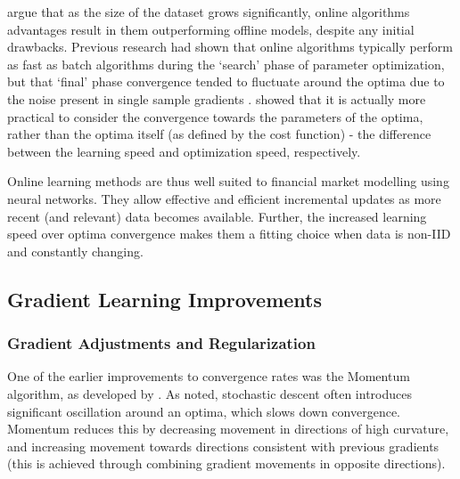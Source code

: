 \documentclass[a4paper,11pt,oneside]{article}
\theoremstyle{plain}
\theoremstyle{definition}
\begin{document}
	\citet{Bottou} argue that as the size of the dataset grows significantly, online algorithms advantages result in 
	them outperforming offline models, despite any initial drawbacks. Previous research had shown that online 
	algorithms typically perform as fast as batch algorithms during the ‘search’ phase of parameter optimization, but 
	that ‘final’ phase convergence tended to fluctuate around the optima due to the noise present in single sample 
	gradients \citep{LeCun, Bottou2}. \citet{Bottou} showed that it is actually more practical to consider the convergence towards
	the parameters of the optima, rather than the optima itself (as defined by the cost function) - the difference 
	between the learning speed and optimization speed, respectively. 
	\hfill\break
	
	Online learning methods are thus well suited to financial market modelling using neural networks. They allow effective and efficient incremental updates as more recent (and relevant) data 
	becomes available. Further, the increased learning speed over optima convergence makes them a fitting choice when data is non-IID and 
	constantly changing.
	
	\subsection{Gradient Learning Improvements}\label{lr_grad_improv}
	
	\subsubsection{Gradient Adjustments and Regularization}
	
	One of the earlier improvements to convergence rates was the Momentum algorithm, as developed by \citet{Tseng}. 
	As noted, stochastic descent often introduces significant oscillation around an optima, which slows down 
	convergence. Momentum reduces this by decreasing movement in directions of high curvature, and  
	increasing movement towards directions consistent with previous gradients (this is achieved through combining 
	gradient movements in opposite directions).
	\hfill\break
	
\end{document}
